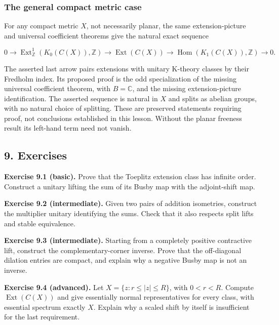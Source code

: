 \documentclass[
  11pt,
]{article}
\begin{document}
\subsubsection{The general compact metric
case}\label{the-general-compact-metric-case}

For any compact metric \(X\), not necessarily planar, the same
extension-picture and universal coefficient theorems give the natural
exact sequence

\[
0\longrightarrow
\operatorname{Ext}^1_{\mathbb Z}(K_0(C(X)),\mathbb Z)
\longrightarrow\operatorname{Ext}(C(X))
\longrightarrow\operatorname{Hom}(K_1(C(X)),\mathbb Z)
\longrightarrow0.
\]

The asserted last arrow pairs extensions with unitary K-theory classes
by their Fredholm index. Its proposed proof is the odd specialization of
the missing universal coefficient theorem, with \(B=\mathbb C\), and the
missing extension-picture identification. The asserted sequence is
natural in \(X\) and splits as abelian groups, with no natural choice of
splitting. These are preserved statements requiring proof, not
conclusions established in this lesson. Without the planar freeness
result its left-hand term need not vanish.

\subsection{9. Exercises}\label{exercises}

\textbf{Exercise 9.1 (basic).} Prove that the Toeplitz extension class
has infinite order. Construct a unitary lifting the sum of its Busby map
with the adjoint-shift map.

\textbf{Exercise 9.2 (intermediate).} Given two pairs of addition
isometries, construct the multiplier unitary identifying the sums. Check
that it also respects split lifts and stable equivalence.

\textbf{Exercise 9.3 (intermediate).} Starting from a completely
positive contractive lift, construct the complementary-corner inverse.
Prove that the off-diagonal dilation entries are compact, and explain
why a negative Busby map is not an inverse.

\textbf{Exercise 9.4 (advanced).} Let \(X=\{z:r\leq|z|\leq R\}\), with
\(0<r<R\). Compute \(\operatorname{Ext}(C(X))\) and give essentially
normal representatives for every class, with essential spectrum exactly
\(X\). Explain why a scaled shift by itself is insufficient for the last
requirement.
\end{document}
